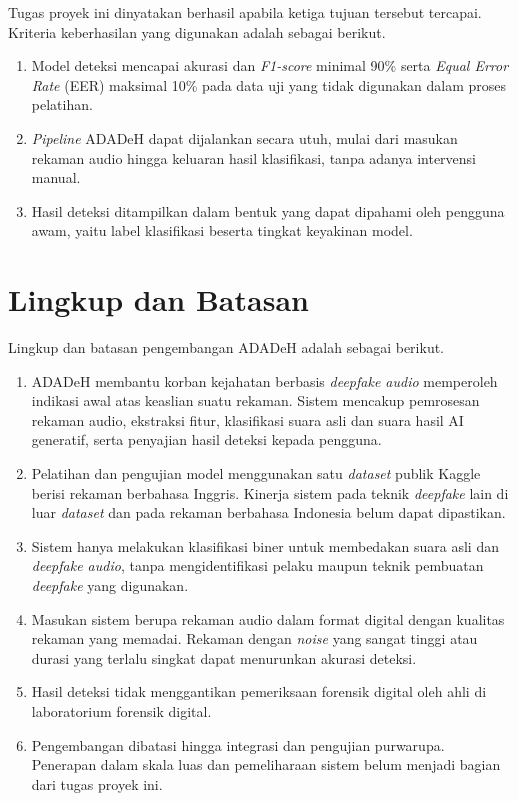 Tugas proyek ini dinyatakan berhasil apabila ketiga tujuan tersebut tercapai. Kriteria keberhasilan yang digunakan adalah sebagai berikut.
\begin{enumerate}
\item	Model deteksi mencapai akurasi dan \textit{F1-score} minimal 90\% serta \textit{Equal Error Rate} (EER) maksimal 10\% pada data uji yang tidak digunakan dalam proses pelatihan.
\item	\textit{Pipeline} ADADeH dapat dijalankan secara utuh, mulai dari masukan rekaman audio hingga keluaran hasil klasifikasi, tanpa adanya intervensi manual.
\item	Hasil deteksi ditampilkan dalam bentuk yang dapat dipahami oleh pengguna awam, yaitu label klasifikasi beserta tingkat keyakinan model.
\end{enumerate}

\section{Lingkup dan Batasan}
Lingkup dan batasan pengembangan ADADeH adalah sebagai berikut.
\begin{enumerate}
\item ADADeH membantu korban kejahatan berbasis \textit{deepfake audio} memperoleh indikasi awal atas keaslian suatu rekaman. Sistem mencakup pemrosesan rekaman audio, ekstraksi fitur, klasifikasi suara asli dan suara hasil AI generatif, serta penyajian hasil deteksi kepada pengguna.
\item Pelatihan dan pengujian model menggunakan satu \textit{dataset} publik Kaggle berisi rekaman berbahasa Inggris. Kinerja sistem pada teknik \textit{deepfake} lain di luar \textit{dataset} dan pada rekaman berbahasa Indonesia belum dapat dipastikan.
\item Sistem hanya melakukan klasifikasi biner untuk membedakan suara asli dan \textit{deepfake audio}, tanpa mengidentifikasi pelaku maupun teknik pembuatan \textit{deepfake} yang digunakan.
\item Masukan sistem berupa rekaman audio dalam format digital dengan kualitas rekaman yang memadai. Rekaman dengan \textit{noise} yang sangat tinggi atau durasi yang terlalu singkat dapat menurunkan akurasi deteksi.
\item Hasil deteksi tidak menggantikan pemeriksaan forensik digital oleh ahli di laboratorium forensik digital.
\item Pengembangan dibatasi hingga integrasi dan pengujian purwarupa. Penerapan dalam skala luas dan pemeliharaan sistem belum menjadi bagian dari tugas proyek ini.
\end{enumerate}

